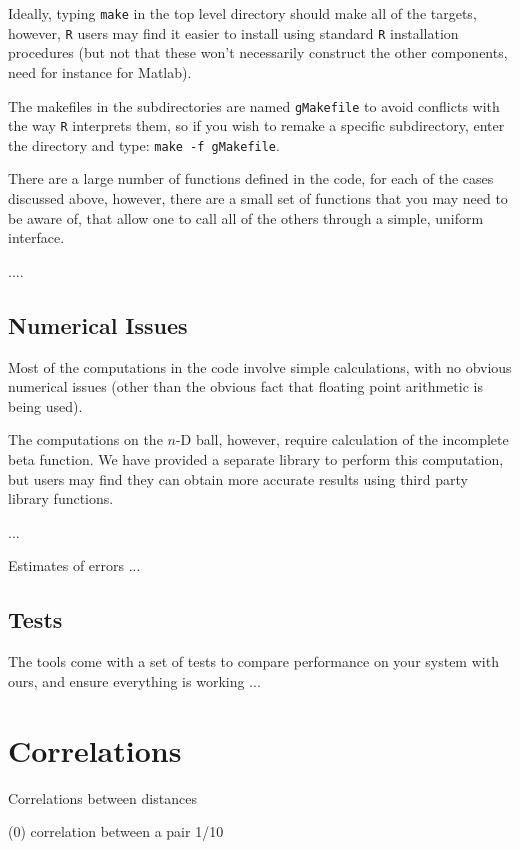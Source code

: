 \documentclass{article}
\begin{document}
Ideally, typing {\tt make} in the top level directory should make all
of the targets, however, {\tt R} users may find it easier to install
using standard {\tt R} installation procedures (but not that these
won't necessarily construct the other components, need for instance
for Matlab).

The makefiles in the subdirectories are named {\tt gMakefile} to avoid
conflicts with the way {\tt R} interprets them, so if you wish to
remake a specific subdirectory, enter the directory and type: 
\verb|make -f gMakefile|.

There are a large number of functions defined in the code, for each of
the cases discussed above, however, there are a small set of functions
that you may need to be aware of, that allow one to call all of the
others through a simple, uniform interface.

....


\subsection{Numerical Issues}

Most of the computations in the code involve simple calculations, with
no obvious numerical issues (other than the obvious fact that floating
point arithmetic is being used).

The computations on the $n$-D ball, however, require calculation of
the incomplete beta function. We have provided a separate library to
perform this computation, but users may find they can obtain more
accurate results using third party library functions. 

...

Estimates of errors ...


\subsection{Tests}

The tools come with a set of tests to compare performance on your
system with ours, and ensure everything is working ...





\section{Correlations}

Correlations between distances \cite{bartlett64}

(0) correlation between a pair 1/10
\end{document}
